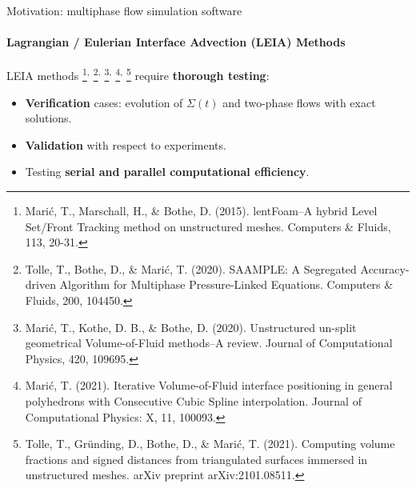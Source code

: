 \begin{frame}{Motivation: multiphase flow simulation software}
    \framesubtitle{Lagrangian / Eulerian Interface Advection (LEIA) Methods}

    \vfill
    LEIA methods
    \footnote{Marić, T., Marschall, H., \& Bothe, D. (2015). lentFoam–A hybrid Level Set/Front Tracking method on unstructured meshes. Computers \& Fluids, 113, 20-31.}\textsuperscript{,}
    \footnote{\footnotesize Tolle, T., Bothe, D., \& Marić, T. (2020). SAAMPLE: A Segregated Accuracy-driven Algorithm for Multiphase Pressure-Linked Equations. Computers \& Fluids, 200, 104450.}\textsuperscript{,}
    \footnote{Marić, T., Kothe, D. B., \& Bothe, D. (2020). Unstructured un-split geometrical Volume-of-Fluid methods–A review. Journal of Computational Physics, 420, 109695.}\textsuperscript{,}
    \footnote{\footnotesize Marić, T. (2021). Iterative Volume-of-Fluid interface positioning in general polyhedrons with Consecutive Cubic Spline interpolation. Journal of Computational Physics: X, 11, 100093.}\textsuperscript{,}
    \footnote{\footnotesize Tolle, T., Gründing, D., Bothe, D., \& Marić, T. (2021). Computing volume fractions and signed distances from triangulated surfaces immersed in unstructured meshes. arXiv preprint arXiv:2101.08511.}
    require \textbf{thorough testing}: 
    \begin{itemize}
        \item \textbf{Verification} cases: evolution of $\Sigma(t)$ and two-phase flows with exact solutions. 

        \item \textbf{Validation} with respect to experiments.  

        \item Testing \textbf{serial and parallel computational efficiency}. 
    \end{itemize}

\end{frame}



